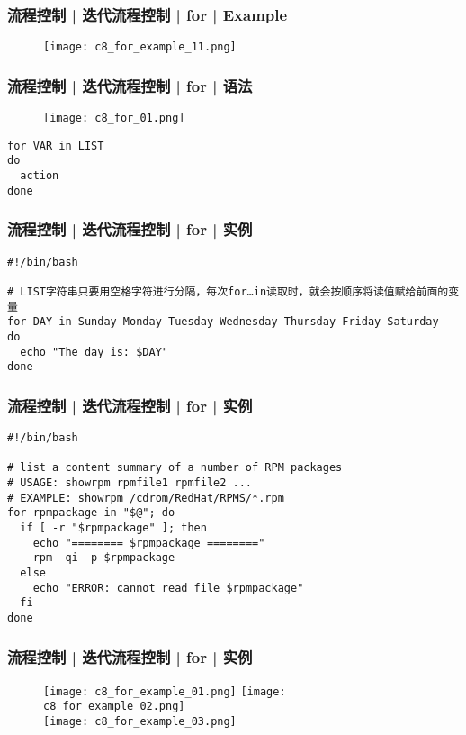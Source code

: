 \begin{frame}
  \frametitle{流程控制 | 迭代流程控制 | for | Example}
  \begin{figure}
    \centering
    \texttt{[image: c8\_for\_example\_11.png]}
  \end{figure}
\end{frame}

\begin{frame}[fragile]
  \frametitle{流程控制 | 迭代流程控制 | for | \alert{语法}}
  \begin{figure}
    \centering
    \texttt{[image: c8\_for\_01.png]}
  \end{figure}
\begin{lstlisting}
for VAR in LIST
do
  action
done
\end{lstlisting}
\end{frame}

\begin{frame}[fragile]
  \frametitle{流程控制 | 迭代流程控制 | for | \alert{实例}}
\begin{lstlisting}
#!/bin/bash

# LIST字符串只要用空格字符进行分隔，每次for…in读取时，就会按顺序将读值赋给前面的变量
for DAY in Sunday Monday Tuesday Wednesday Thursday Friday Saturday
do
  echo "The day is: $DAY"
done
\end{lstlisting}
\end{frame}

\begin{frame}[fragile]
  \frametitle{流程控制 | 迭代流程控制 | for | 实例}
\begin{lstlisting}
#!/bin/bash

# list a content summary of a number of RPM packages
# USAGE: showrpm rpmfile1 rpmfile2 ...
# EXAMPLE: showrpm /cdrom/RedHat/RPMS/*.rpm
for rpmpackage in "$@"; do
  if [ -r "$rpmpackage" ]; then
    echo "======== $rpmpackage ========"
    rpm -qi -p $rpmpackage
  else
    echo "ERROR: cannot read file $rpmpackage"
  fi
done
\end{lstlisting}
\end{frame}

\begin{frame}
  \frametitle{流程控制 | 迭代流程控制 | for | \alert{实例}}
  \begin{figure}
    \texttt{[image: c8\_for\_example\_01.png]}\quad
    \texttt{[image: c8\_for\_example\_02.png]}\\
    \texttt{[image: c8\_for\_example\_03.png]}
  \end{figure}
\end{frame}

